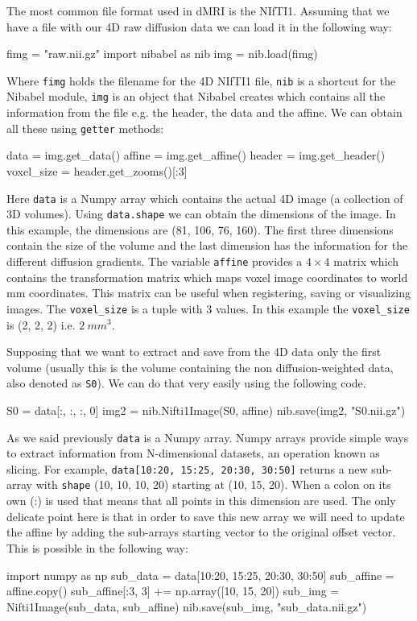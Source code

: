 \documentclass{bioinfo}
\begin{document}
The most common file format used in dMRI is the NIfTI1. Assuming that we have a
file with our 4D raw diffusion data we can load it in the following way:
\begin{python}
fimg = "raw.nii.gz"
import nibabel as nib
img = nib.load(fimg)
\end{python}
Where \texttt{fimg} holds the filename for the 4D NIfTI1 file, \texttt{nib} is
a shortcut for the Nibabel module, \texttt{img} is an object that Nibabel
creates which contains all the information from the file e.g. the header, the
data and the affine. We can obtain all these using \texttt{getter} methods:
\begin{python}
data = img.get_data()
affine = img.get_affine()
header = img.get_header()
voxel_size = header.get_zooms()[:3]
\end{python}
Here \texttt{data} is a Numpy array which contains the actual 4D image (a
collection of 3D volumes). Using \texttt{data.shape} we can obtain the
dimensions of the image. In this example, the dimensions are (81, 106, 76,
160). The first three dimensions contain the size of the volume and the last
dimension has the information for the different diffusion gradients. The
variable \texttt{affine} provides a $4\times4$ matrix which contains the
transformation matrix which maps voxel image coordinates to world mm
coordinates. This matrix can be useful when registering, saving or visualizing
images. The \texttt{voxel\_size} is a tuple with 3 values. In this example the
\texttt{voxel\_size} is (2, 2, 2) i.e. $2~mm^3$.

Supposing that we want to extract and save from the 4D data only the first
volume (usually this is the volume containing the non diffusion-weighted data,
also denoted as \texttt{S0}). We can do that very easily using the following code.
\begin{python}
S0 = data[:, :, :, 0]
img2 = nib.Nifti1Image(S0, affine)
nib.save(img2, "S0.nii.gz")
\end{python}
As we said previously \texttt{data} is a Numpy array. Numpy arrays provide
simple ways to extract information from N-dimensional datasets, an operation
known as slicing. For example, \texttt{data[10:20, 15:25, 20:30, 30:50]}
returns a new sub-array with \texttt{shape} (10, 10, 10, 20) starting at (10, 15, 20). When a
colon on its own (:) is used that means that all points in this dimension are used. The
only delicate point here is that in order to save this new array we will need
to update the affine by adding the sub-arrays starting vector to the original offset vector. This is possible in the following way:
\begin{python}
import numpy as np
sub_data = data[10:20, 15:25, 20:30, 30:50]
sub_affine = affine.copy()
sub_affine[:3, 3] += np.array([10, 15, 20])
sub_img = Nifti1Image(sub_data, sub_affine)
nib.save(sub_img, "sub_data.nii.gz")
\end{python}
\end{document}
